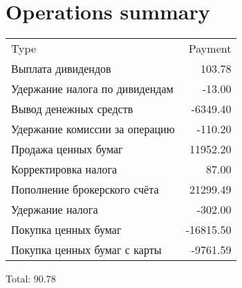 \documentclass{article}%
\begin{document}
%
\normalsize%
\section{Operations summary}%
\label{sec:Operationssummary}%
\begin{tabular}{l r}%
Type&Payment\\%
Выплата дивидендов&103.78\\%
Удержание налога по дивидендам&{-}13.00\\%
Вывод денежных средств&{-}6349.40\\%
Удержание комиссии за операцию&{-}110.20\\%
Продажа ценных бумаг&11952.20\\%
Корректировка налога&87.00\\%
Пополнение брокерского счёта&21299.49\\%
Удержание налога&{-}302.00\\%
Покупка ценных бумаг&{-}16815.50\\%
Покупка ценных бумаг с карты&{-}9761.59\\%
\end{tabular}%
Total: 90.78

%
\end{document}
